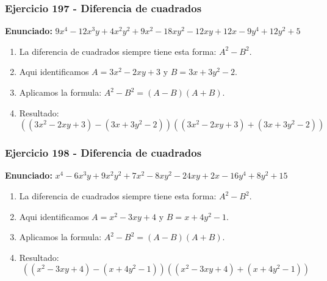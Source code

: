 \documentclass[11pt,a4paper]{article}
\begin{document}
\vspace{0.2cm}
\subsubsection*{Ejercicio 197 - Diferencia de cuadrados}
\textbf{Enunciado:} $ 9 x^{4} - 12 x^{3} y + 4 x^{2} y^{2} + 9 x^{2} - 18 x y^{2} - 12 x y + 12 x - 9 y^{4} + 12 y^{2} + 5 $\par
\begin{enumerate}[leftmargin=2em]
\item La diferencia de cuadrados siempre tiene esta forma: \(A^2-B^2\).
\item Aqui identificamos \(A=3 x^{2} - 2 x y + 3\) y \(B=3 x + 3 y^{2} - 2\).
\item Aplicamos la formula: \(A^2-B^2=(A-B)(A+B)\).
\item Resultado: \[\boxed{\left(\left(3 x^{2} - 2 x y + 3\right)-\left(3 x + 3 y^{2} - 2\right)\right)\left(\left(3 x^{2} - 2 x y + 3\right)+\left(3 x + 3 y^{2} - 2\right)\right)}\]
\end{enumerate}

\vspace{0.2cm}
\subsubsection*{Ejercicio 198 - Diferencia de cuadrados}
\textbf{Enunciado:} $ x^{4} - 6 x^{3} y + 9 x^{2} y^{2} + 7 x^{2} - 8 x y^{2} - 24 x y + 2 x - 16 y^{4} + 8 y^{2} + 15 $\par
\begin{enumerate}[leftmargin=2em]
\item La diferencia de cuadrados siempre tiene esta forma: \(A^2-B^2\).
\item Aqui identificamos \(A=x^{2} - 3 x y + 4\) y \(B=x + 4 y^{2} - 1\).
\item Aplicamos la formula: \(A^2-B^2=(A-B)(A+B)\).
\item Resultado: \[\boxed{\left(\left(x^{2} - 3 x y + 4\right)-\left(x + 4 y^{2} - 1\right)\right)\left(\left(x^{2} - 3 x y + 4\right)+\left(x + 4 y^{2} - 1\right)\right)}\]
\end{enumerate}

\vspace{0.2cm}
\end{document}
